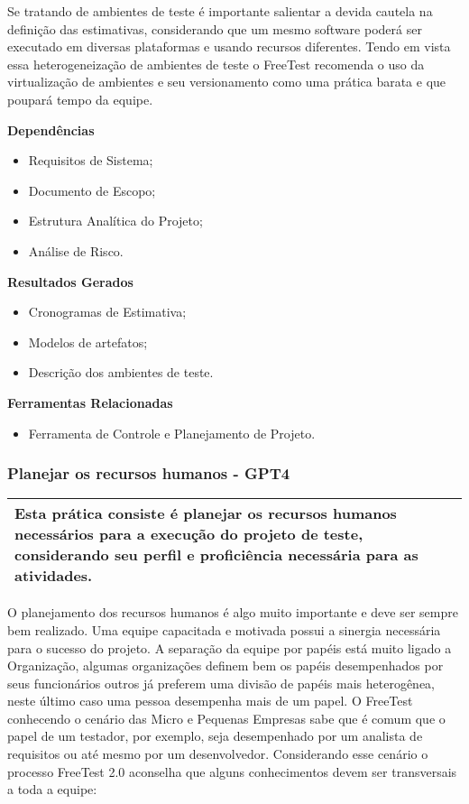 Se tratando de ambientes de teste é importante salientar a devida cautela na definição das estimativas, considerando que um mesmo software poderá ser executado em diversas plataformas e usando recursos diferentes. Tendo em vista essa heterogeneização de ambientes de teste o FreeTest recomenda o uso da virtualização de ambientes e seu versionamento como uma prática barata e que poupará tempo da equipe.

\textbf{Dependências}
\begin{itemize}
    \item Requisitos de Sistema;
    \item Documento de Escopo;
    \item Estrutura Analítica do Projeto;
    \item Análise de Risco.
\end{itemize}

\textbf{Resultados Gerados}
\begin{itemize}
    \item Cronogramas de Estimativa;
    \item Modelos de artefatos;
    \item Descrição dos ambientes de teste.
\end{itemize}

\textbf{Ferramentas Relacionadas}
\begin{itemize}
    \item Ferramenta de Controle e Planejamento de Projeto.
\end{itemize}

\subsubsection{Planejar os recursos humanos - GPT4}
\label{sec:gpt4}

\begin{table}[!ht]
\centering
\begin{tabular}{|p{130mm}|}
\hline
Esta prática consiste é planejar os recursos humanos necessários para a execução do projeto de teste, considerando seu perfil e proficiência necessária para as atividades. \\ 
\hline
\end{tabular}
\end{table}

O planejamento dos recursos humanos é algo muito importante e deve ser sempre bem realizado. Uma equipe capacitada e motivada possui a sinergia necessária para o sucesso do projeto. A separação da equipe por papéis está muito ligado a Organização, algumas organizações definem bem os papéis desempenhados por seus funcionários outros já preferem uma divisão de papéis mais heterogênea, neste último caso uma pessoa desempenha mais de um papel. O FreeTest conhecendo o cenário das Micro e Pequenas Empresas sabe que é comum que o papel de um testador, por exemplo, seja desempenhado por um analista de requisitos ou até mesmo por um desenvolvedor. Considerando esse cenário o processo FreeTest 2.0 aconselha que alguns conhecimentos devem ser transversais a toda a equipe:

